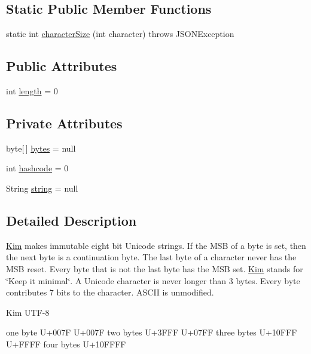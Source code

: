 \subsection*{Static Public Member Functions}
\begin{DoxyCompactItemize}
\item 
static int \hyperlink{classorg_1_1json_1_1_kim_a8d2ebca093fcc820ae233af45fb2ab75}{character\-Size} (int character)  throws J\-S\-O\-N\-Exception 
\end{DoxyCompactItemize}
\subsection*{Public Attributes}
\begin{DoxyCompactItemize}
\item 
int \hyperlink{classorg_1_1json_1_1_kim_a6caa186b493021e083e4efbf734e3a40}{length} = 0
\end{DoxyCompactItemize}
\subsection*{Private Attributes}
\begin{DoxyCompactItemize}
\item 
byte\mbox{[}$\,$\mbox{]} \hyperlink{classorg_1_1json_1_1_kim_aca37e9b2f118afc91bc8d1f37512819b}{bytes} = null
\item 
int \hyperlink{classorg_1_1json_1_1_kim_aab8a2339df2bbc09510350775572ecf2}{hashcode} = 0
\item 
String \hyperlink{classorg_1_1json_1_1_kim_ab3c21a745d0601eb36105ec3769a310a}{string} = null
\end{DoxyCompactItemize}


\subsection{Detailed Description}
\hyperlink{classorg_1_1json_1_1_kim}{Kim} makes immutable eight bit Unicode strings. If the M\-S\-B of a byte is set, then the next byte is a continuation byte. The last byte of a character never has the M\-S\-B reset. Every byte that is not the last byte has the M\-S\-B set. \hyperlink{classorg_1_1json_1_1_kim}{Kim} stands for \char`\"{}\-Keep it minimal\char`\"{}. A Unicode character is never longer than 3 bytes. Every byte contributes 7 bits to the character. A\-S\-C\-I\-I is unmodified. \begin{DoxyVerb}             Kim             UTF-8
\end{DoxyVerb}
 one byte U+007\-F U+007\-F two bytes U+3\-F\-F\-F U+07\-F\-F three bytes U+10\-F\-F\-F U+\-F\-F\-F\-F four bytes U+10\-F\-F\-F\-F

